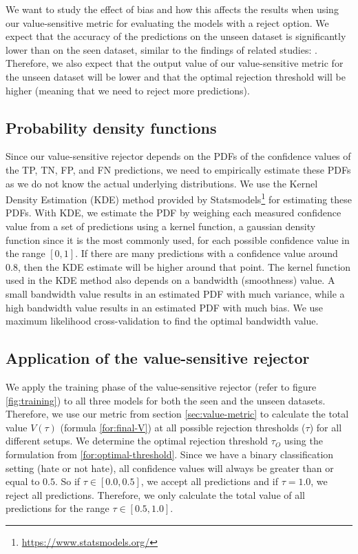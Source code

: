 %
We want to study the effect of bias and how this affects the results when using our value-sensitive metric for evaluating the models with a reject option.
%
We expect that the accuracy of the predictions on the unseen dataset is significantly lower than on the seen dataset, similar to the findings of related studies: \citet{grondahl2018all, arango2019hate}.
%
Therefore, we also expect that the output value of our value-sensitive metric for the unseen dataset will be lower and that the optimal rejection threshold will be higher (meaning that we need to reject more predictions).
%

\subsection{Probability density functions}
Since our value-sensitive rejector depends on the PDFs of the confidence values of the TP, TN, FP, and FN predictions, we need to empirically estimate these PDFs as we do not know the actual underlying distributions.
%
We use the Kernel Density Estimation (KDE) method provided by Statsmodels\footnote{\url{https://www.statsmodels.org/}} for estimating these PDFs.
%
With KDE, we estimate the PDF by weighing each measured confidence value from a set of predictions using a kernel function, a gaussian density function since it is the most commonly used, for each possible confidence value in the range $[0, 1]$.
%
If there are many predictions with a confidence value around $0.8$, then the KDE estimate will be higher around that point.
%
The kernel function used in the KDE method also depends on a bandwidth (smoothness) value.
%
A small bandwidth value results in an estimated PDF with much variance, while a high bandwidth value results in an estimated PDF with much bias.
%
We use maximum likelihood cross-validation to find the optimal bandwidth value.

\subsection{Application of the value-sensitive rejector}
\label{sec:rejector-application}
We apply the training phase of the value-sensitive rejector (refer to figure \ref{fig:training}) to all three models for both the seen and the unseen datasets.
%
Therefore, we use our metric from section \ref{sec:value-metric} to calculate the total value $V(\tau)$ (formula \ref{for:final-V}) at all possible rejection thresholds ($\tau$) for all different setups.
%
We determine the optimal rejection threshold $\tau_O$ using the formulation from \ref{for:optimal-threshold}.
%
Since we have a binary classification setting (hate or not hate), all confidence values will always be greater than or equal to $0.5$.
%
So if $\tau \in [0.0, 0.5]$, we accept all predictions and if $\tau = 1.0$, we reject all predictions.
%
Therefore, we only calculate the total value of all predictions for the range $\tau \in [0.5, 1.0]$.
%

